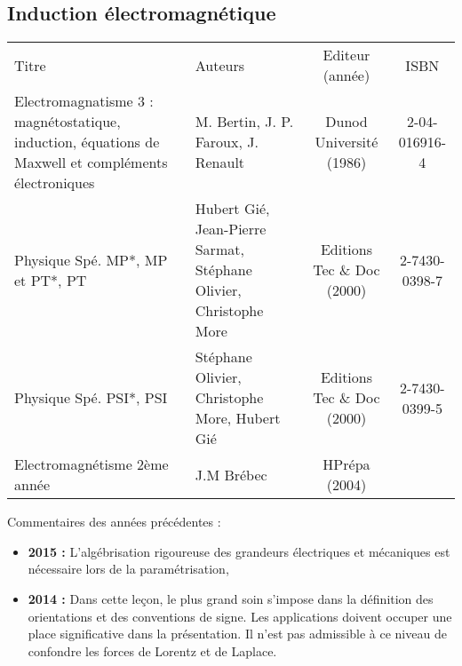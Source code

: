 \begin{headerBlock}
 \chapter{Induction électromagnétique}
 \label{LP_Induction}
\end{headerBlock}

\begin{center}
\begin{tabularx}{\textwidth}{| X | X | c | c |}
  \hline
  \rowcolor{gray!20}\multicolumn{4}{c}{Bibliographie de la leçon : } \\
  \hline 
  Titre & Auteurs & Editeur (année) & ISBN \\
  \hline
   Electromagnatisme 3 : magnétostatique, induction, équations de Maxwell et compléments électroniques & M. Bertin, J. P. Faroux, J. Renault & Dunod Université (1986) & 2-04-016916-4 \\
  \hline 
   Physique Spé. MP*, MP et PT*, PT & Hubert Gié, Jean-Pierre Sarmat, Stéphane Olivier, Christophe More & Editions Tec \& Doc (2000) & 2-7430-0398-7 \\
  \hline 
   Physique Spé. PSI*, PSI & Stéphane Olivier, Christophe More, Hubert Gié & Editions Tec \& Doc (2000) & 2-7430-0399-5 \\
  \hline 
  Electromagnétisme 2ème année & J.M Brébec & HPrépa (2004) & \\
  \hline
\end{tabularx}
\end{center}

\begin{reportBlock}{Commentaires des années précédentes :}
    \begin{itemize}
        \item \textbf{2015 :} L’algébrisation rigoureuse des grandeurs électriques et mécaniques est nécessaire lors de la paramétrisation,
        \item \textbf{2014 :} Dans cette leçon, le plus grand soin s’impose dans la définition des orientations et des conventions de signe. Les applications doivent occuper une place significative dans la présentation. Il n’est pas admissible à ce niveau de confondre les forces de Lorentz et de Laplace.
    \end{itemize}
\end{reportBlock}


